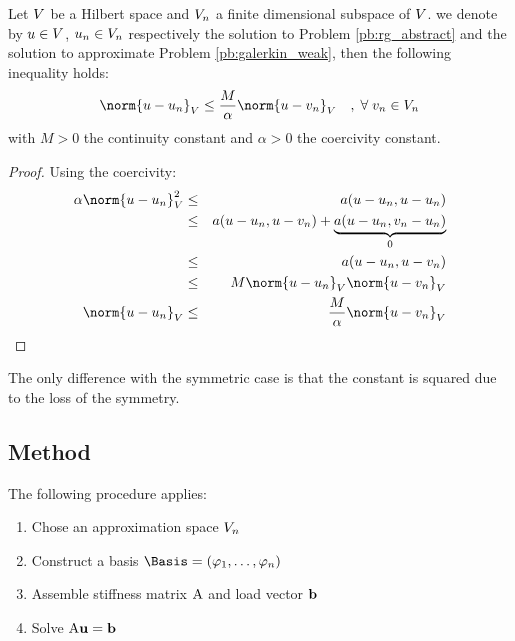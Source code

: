 \begin{lmm}[Consistency]
Let ${V}$ be a Hilbert space and ${V}_n$ a finite dimensional subspace of ${V}$.
we denote by $u \in {V}$, $u_n \in {V}_n$ respectively the solution to Problem \eqref{pb:rg_abstract} and the solution to approximate Problem \eqref{pb:galerkin_weak}, then the following inequality holds:
\begin{equation*}
\norm{u - u_n}_\xV  \leq \dfrac{M}{\alpha} \norm{u - v_n}_\xV\quad,\; \forany v_n \in \xV_n
\end{equation*}
with $M > 0$ the continuity constant and $\alpha > 0$ the coercivity constant.
\end{lmm}
\begin{proof}
Using the coercivity:
\begin{eqnarray*}
\alpha \norm{u - u_n}_\xV^2 &\leq& a(u - u_n, u - u_n)\\
 &\leq& a(u - u_n, u - v_n) + \underbrace{a(u - u_n, v_n - u_n)}_{0}\\
 &\leq& a(u - u_n, u - v_n)\\
 &\leq& M \norm{u - u_n}_\xV \norm{u - v_n}_\xV\\
\norm{u - u_n}_\xV &\leq& \dfrac{M}{\alpha} \norm{u - v_n}_\xV\\
\end{eqnarray*}
\end{proof}

The only difference with the symmetric case is that the constant is squared due to the loss of the symmetry.

\subsection{Method}

\begin{lgrthm}\label{alg:galerkin} The following procedure applies:
\begin{enumerate}
\item Chose an approximation space ${V}_n$
\item Construct a basis $\Basis= (\varphi_1,\dots,\varphi_n)$
\item Assemble stiffness matrix ${\mathrm A}$ and load vector $\mathbf b$
\item Solve ${\mathrm A} \mathbf u = \mathbf b$
\end{enumerate}
\end{lgrthm}


